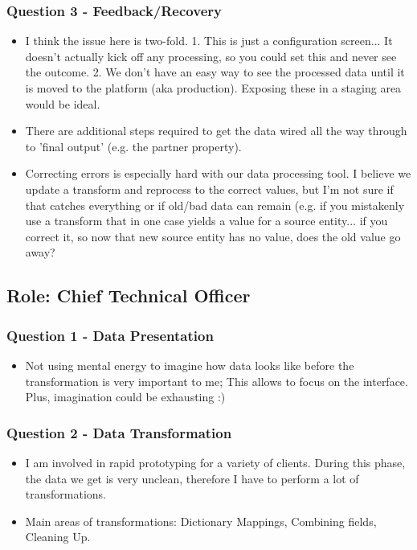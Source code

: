 \documentclass[12pt,letterpaper]{article}
\begin{document}
\subsubsection*{Question 3 - Feedback/Recovery}
\begin{itemize}
    \item I think the issue here is two-fold. 1. This is just a configuration screen... It doesn't actually kick off any processing, so you could set this and never see the outcome. 2. We don't have an easy way to see the processed data until it is moved to the platform (aka production). Exposing these in a staging area would be ideal.
    \item There are additional steps required to get the data wired all the way through to 'final output' (e.g. the partner property). 
    \item Correcting errors is especially hard with our data processing tool. I believe we update a transform and reprocess to the correct values, but I'm not sure if that catches everything or if old/bad data can remain (e.g. if you mistakenly use a transform that in one case yields a value for a source entity... if you correct it, so now that new source entity has no value, does the old value go away?
\end{itemize}

\subsection*{Role: Chief Technical Officer}
\subsubsection*{Question 1 - Data Presentation}

\begin{itemize}
    \item Not using mental energy to imagine how data looks like before the transformation is very important to me; This allows to focus on the interface. Plus, imagination could be exhausting :)
\end{itemize}

\subsubsection*{Question 2 - Data Transformation}
\begin{itemize}
    \item I am involved in rapid prototyping for a variety of clients. During this phase, the data we get is very unclean, therefore I have to perform a lot of transformations.
    \item Main areas of transformations: Dictionary Mappings, Combining fields, Cleaning Up.
\end{itemize}
\end{document}
